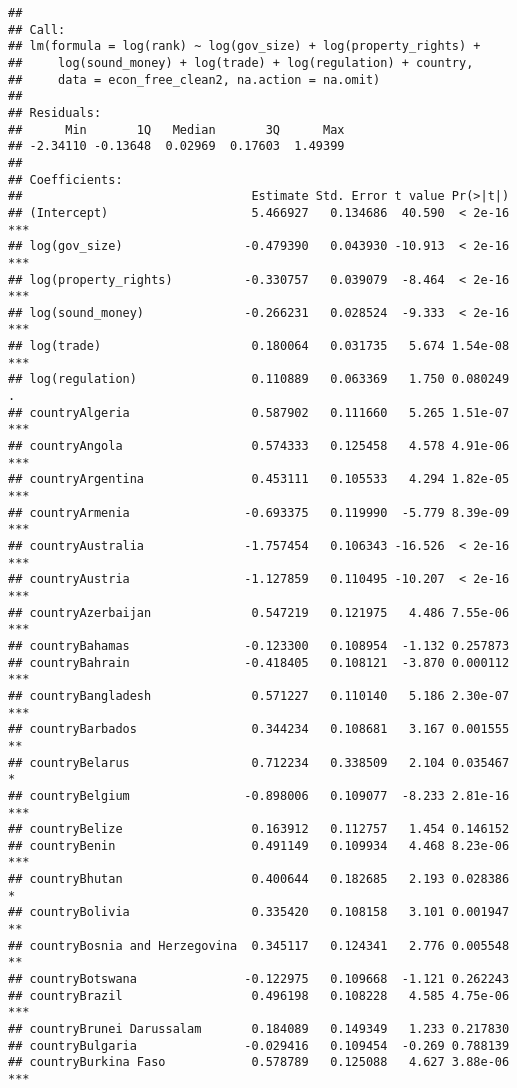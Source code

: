\documentclass[
  11pt,
]{article}
\begin{document}
\begin{verbatim}
## 
## Call:
## lm(formula = log(rank) ~ log(gov_size) + log(property_rights) + 
##     log(sound_money) + log(trade) + log(regulation) + country, 
##     data = econ_free_clean2, na.action = na.omit)
## 
## Residuals:
##      Min       1Q   Median       3Q      Max 
## -2.34110 -0.13648  0.02969  0.17603  1.49399 
## 
## Coefficients:
##                                Estimate Std. Error t value Pr(>|t|)    
## (Intercept)                    5.466927   0.134686  40.590  < 2e-16 ***
## log(gov_size)                 -0.479390   0.043930 -10.913  < 2e-16 ***
## log(property_rights)          -0.330757   0.039079  -8.464  < 2e-16 ***
## log(sound_money)              -0.266231   0.028524  -9.333  < 2e-16 ***
## log(trade)                     0.180064   0.031735   5.674 1.54e-08 ***
## log(regulation)                0.110889   0.063369   1.750 0.080249 .  
## countryAlgeria                 0.587902   0.111660   5.265 1.51e-07 ***
## countryAngola                  0.574333   0.125458   4.578 4.91e-06 ***
## countryArgentina               0.453111   0.105533   4.294 1.82e-05 ***
## countryArmenia                -0.693375   0.119990  -5.779 8.39e-09 ***
## countryAustralia              -1.757454   0.106343 -16.526  < 2e-16 ***
## countryAustria                -1.127859   0.110495 -10.207  < 2e-16 ***
## countryAzerbaijan              0.547219   0.121975   4.486 7.55e-06 ***
## countryBahamas                -0.123300   0.108954  -1.132 0.257873    
## countryBahrain                -0.418405   0.108121  -3.870 0.000112 ***
## countryBangladesh              0.571227   0.110140   5.186 2.30e-07 ***
## countryBarbados                0.344234   0.108681   3.167 0.001555 ** 
## countryBelarus                 0.712234   0.338509   2.104 0.035467 *  
## countryBelgium                -0.898006   0.109077  -8.233 2.81e-16 ***
## countryBelize                  0.163912   0.112757   1.454 0.146152    
## countryBenin                   0.491149   0.109934   4.468 8.23e-06 ***
## countryBhutan                  0.400644   0.182685   2.193 0.028386 *  
## countryBolivia                 0.335420   0.108158   3.101 0.001947 ** 
## countryBosnia and Herzegovina  0.345117   0.124341   2.776 0.005548 ** 
## countryBotswana               -0.122975   0.109668  -1.121 0.262243    
## countryBrazil                  0.496198   0.108228   4.585 4.75e-06 ***
## countryBrunei Darussalam       0.184089   0.149349   1.233 0.217830    
## countryBulgaria               -0.029416   0.109454  -0.269 0.788139    
## countryBurkina Faso            0.578789   0.125088   4.627 3.88e-06 ***

\end{verbatim}
\end{document}
